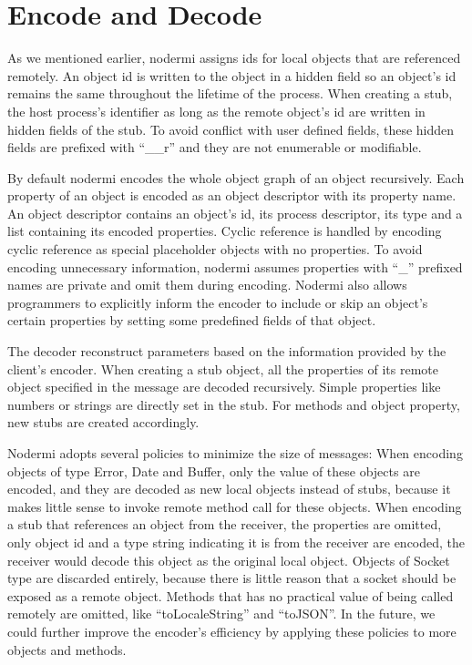 \section{Encode and Decode}
As we mentioned earlier, nodermi assigns ids for local
objects that are referenced remotely.
An object id is written to the object in a hidden field
so an object's id remains the same throughout the lifetime of the process.
When creating a stub,
the host process's identifier as long as the remote object's id
are written in hidden fields of the stub.
To avoid conflict with user defined fields, these hidden fields are prefixed
with ``\_\_r'' and they are not enumerable or modifiable.

By default nodermi encodes the whole object graph of an object recursively.
Each property of an object is encoded 
as an object descriptor with its property name.
An object descriptor contains an object's id, its process descriptor,
its type and a list containing its encoded properties.
Cyclic reference is handled by encoding cyclic reference as
special placeholder objects with no properties.
To avoid encoding unnecessary information,
nodermi assumes properties with ``\_'' prefixed names are private
 and omit them during encoding.
Nodermi also allows programmers to explicitly 
inform the encoder to include or skip 
an object's certain properties
by setting some predefined fields of that object.

The decoder reconstruct parameters based on the information 
provided by the client's encoder.
When creating a stub object,
all the properties of its remote object specified in the message 
are decoded recursively.
Simple properties like numbers or strings are directly set in the stub.
For methods and object property, new stubs are created accordingly.

Nodermi adopts several policies to minimize the size of messages:
When encoding objects of type Error, Date and Buffer,
only the value of these objects are encoded,
and they are decoded as new local objects instead of stubs,
because it makes little sense to invoke remote method call for these objects.
When encoding a stub that references an object from the receiver,
the properties are omitted, only object id and a type string indicating 
it is from the receiver are encoded,
the receiver would decode this object as the original local object.
Objects of Socket type are discarded entirely, because
there is little reason that a socket should be exposed as a remote object.
Methods that has no practical value of being called remotely are
omitted, like ``toLocaleString'' and ``toJSON''.
In the future, 
we could further improve the encoder's efficiency 
by applying these policies to more objects and methods.


